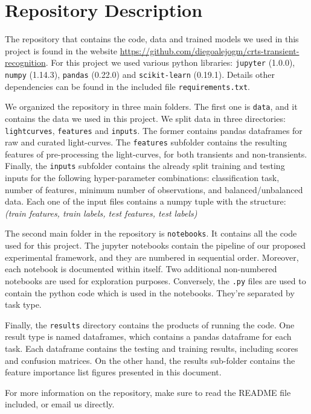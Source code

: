 \documentclass[a4paper,fleqn,usenatbib]{mnras}
\begin{document}
\section{Repository Description} \label{section_code}

The repository that contains the code, data and trained models we used in this project is found in the website \url{https://github.com/diegoalejogm/crts-transient-recognition}. For this project we used various python libraries: \texttt{jupyter} (1.0.0), \texttt{numpy} (1.14.3), \texttt{pandas} (0.22.0) and \texttt{scikit-learn} (0.19.1). Details other dependencies can be found in the included file \texttt{requirements.txt}.

We organized the repository in three main folders. The first one is \texttt{data}, and it contains the data we used in this project. We split data in three directories: \texttt{lightcurves}, \texttt{features} and \texttt{inputs}. The former contains pandas dataframes for raw and curated light-curves. The \texttt{features} subfolder contains the resulting features of pre-processing the light-curves, for both transients and non-transients. Finally, the \texttt{inputs} subfolder contains the already split training and testing inputs for the following hyper-parameter combinations: classification task, number of features, minimum number of observations, and balanced/unbalanced data. Each one of the input files contains a numpy tuple with the structure: \textit{(train features, train labels, test features, test labels)}

The second main folder in the repository is \texttt{notebooks}. It contains all the code used for this project. The jupyter notebooks contain the pipeline of our proposed experimental framework, and they are numbered in sequential order. Moreover, each notebook is documented within itself. Two additional non-numbered notebooks are used for exploration purposes. Conversely, the \texttt{.py} files are used to contain the python code which is used in the notebooks. They're separated by task type.

Finally, the \texttt{results} directory contains the products of running the code. One result type is named dataframes, which contains a pandas dataframe for each task. Each dataframe contains the testing and training results, including scores and confusion matrices.  On the other hand, the results sub-folder contains the feature importance list figures presented in this document.

For more information on the repository, make sure to read the README file included, or email us directly.
\end{document}
